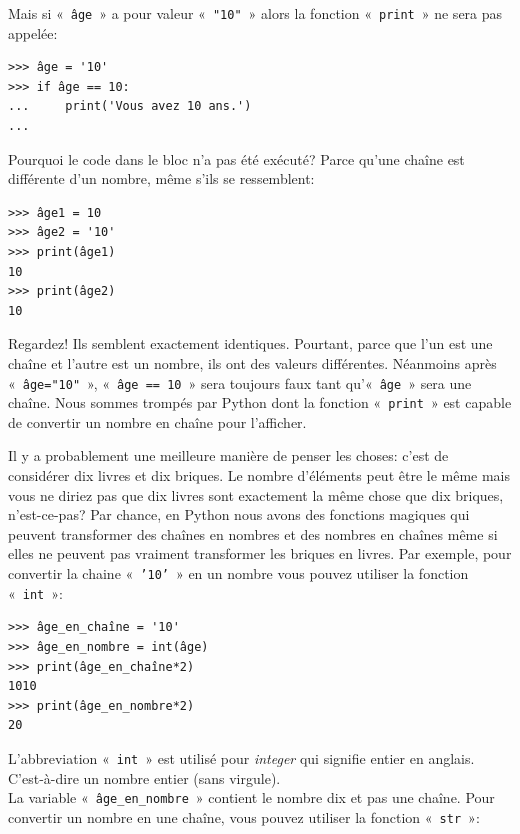 Mais si «~\texttt{âge}~»  a pour valeur «~\texttt{"10"}~» alors la fonction «~\texttt{print}~» ne sera pas appelée:

\begin{Verbatim}[frame=single,rulecolor=\color{green}, label=à taper avec attention]
>>> âge = '10'
>>> if âge == 10:
...     print('Vous avez 10 ans.')
...
\end{Verbatim}

Pourquoi le code dans le bloc n'a pas été exécuté? Parce qu'une chaîne est différente d'un nombre, même s'ils se ressemblent:

\begin{Verbatim}[frame=single,rulecolor=\color{mbleu}, label=à taper]
>>> âge1 = 10
>>> âge2 = '10'
>>> print(âge1)
10
>>> print(âge2)
10
\end{Verbatim}

Regardez! Ils semblent exactement identiques. Pourtant, parce que l'un est une chaîne et l'autre est un nombre, ils ont des valeurs différentes. Néanmoins après «~\texttt{âge="10"}~», «~\texttt{âge == 10}~»  sera toujours faux tant qu'«~\texttt{âge}~» sera une chaîne.  Nous sommes trompés par Python dont la fonction «~\texttt{print}~» est capable de convertir un nombre en chaîne pour l'afficher.

Il y a probablement une meilleure manière de penser les choses: c'est de considérer dix livres et dix briques. Le nombre d'éléments peut être le même mais vous ne diriez pas que dix livres sont exactement la même chose que dix briques, n'est-ce-pas? Par chance, en Python nous avons des fonctions magiques qui peuvent transformer des chaînes en nombres et des nombres en chaînes même si elles ne peuvent pas vraiment transformer les briques en livres. Par exemple, pour convertir la chaine «~\texttt{'10'}~»  en un nombre vous pouvez utiliser la fonction «~\texttt{int}~»: 

\begin{Verbatim}[frame=single,rulecolor=\color{mbleu}, label=à taper]
>>> âge_en_chaîne = '10'
>>> âge_en_nombre = int(âge)
>>> print(âge_en_chaîne*2)
1010
>>> print(âge_en_nombre*2)
20
\end{Verbatim}

L'abbreviation «~\texttt{int}~»  est utilisé  pour \emph{integer} qui signifie entier en anglais. C'est-à-dire un nombre entier (sans virgule).\\

La variable «~\texttt{âge\_en\_nombre}~» contient le nombre dix et pas une chaîne. Pour convertir un nombre en une chaîne, vous pouvez utiliser la fonction «~\texttt{str}~»:


